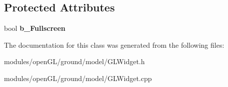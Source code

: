 \subsection*{Protected Attributes}
\begin{DoxyCompactItemize}
\item 
\hypertarget{classGLWidget_ad13ccbe42c40518e3a347f21f247c51a}{bool {\bfseries b\-\_\-\-Fullscreen}}\label{classGLWidget_ad13ccbe42c40518e3a347f21f247c51a}

\end{DoxyCompactItemize}


The documentation for this class was generated from the following files\-:\begin{DoxyCompactItemize}
\item 
modules/open\-G\-L/ground/model/G\-L\-Widget.\-h\item 
modules/open\-G\-L/ground/model/G\-L\-Widget.\-cpp\end{DoxyCompactItemize}
